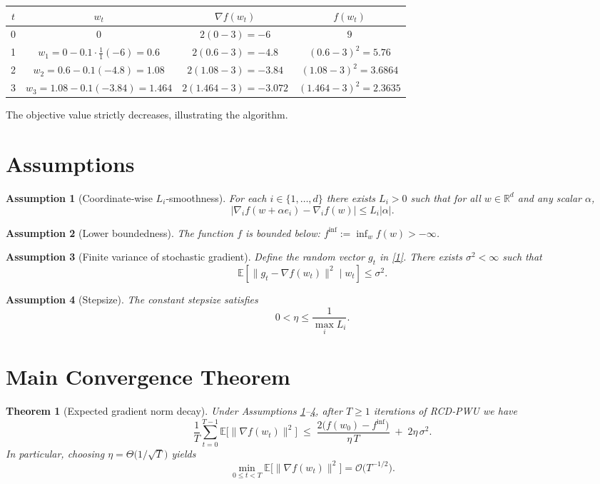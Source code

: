 \documentclass[11pt]{article}
\newtheorem{theorem}{Theorem}
\newtheorem{assumption}{Assumption}
\newcommand{\E}{\mathbb{E}}
\newcommand{\R}{\mathbb{R}}
\begin{document}
\begin{center}
\begin{tabular}{c|c|c|c}
$t$ & $w_t$ & $\nabla f(w_t)$ & $f(w_t)$\\ \hline
0 & $0$ & $2(0-3)=-6$ & $9$\\
1 & $w_1 = 0-0.1\cdot\frac{1}{1}(-6)=0.6$ &
       $2(0.6-3)=-4.8$ & $(0.6-3)^2=5.76$\\
2 & $w_2 = 0.6-0.1(-4.8)=1.08$ &
       $2(1.08-3)=-3.84$ & $(1.08-3)^2=3.6864$\\
3 & $w_3 = 1.08-0.1(-3.84)=1.464$ &
       $2(1.464-3)=-3.072$ & $(1.464-3)^2=2.3635$\\
\end{tabular}
\end{center}
The objective value strictly decreases, illustrating the algorithm.

\newpage

\section*{Assumptions}
\begin{assumption}[Coordinate‑wise $L_i$‑smoothness]\label{ass:smooth}
For each $i\in\{1,\dots ,d\}$ there exists $L_i>0$ such that for all
$w\in\R^{d}$ and any scalar $\alpha$,
\[
\bigl|\nabla_i f(w+\alpha e_i)-\nabla_i f(w)\bigr|\le L_i|\alpha|.
\tag{4}
\]
\end{assumption}

\begin{assumption}[Lower boundedness]\label{ass:bound}
The function $f$ is bounded below: $f^{\inf}:=\inf_{w}f(w)>-\infty$.
\end{assumption}

\begin{assumption}[Finite variance of stochastic gradient]\label{ass:var}
Define the random vector $g_t$ in \eqref{1}.  There exists $\sigma^2<\infty$ such that
\[
\E\!\left[\|g_t-\nabla f(w_t)\|^2\mid w_t\right]\le \sigma^2 .
\tag{5}
\]
\end{assumption}

\begin{assumption}[Stepsize]\label{ass:stepsize}
The constant stepsize satisfies
\[
0<\eta\le \frac{1}{\max_{i}L_i}.
\tag{6}
\]
\end{assumption}

\section*{Main Convergence Theorem}
\begin{theorem}[Expected gradient norm decay]\label{thm:main}
Under Assumptions \ref{ass:smooth}–\ref{ass:stepsize}, after $T\ge1$
iterations of RCD‑PWU we have
\[
\frac{1}{T}\sum_{t=0}^{T-1}\E\!\bigl[\|\nabla f(w_t)\|^2\bigr]
\;\le\;
\frac{2\bigl(f(w_0)-f^{\inf}\bigr)}{\eta\,T}
\;+\;
2\eta\,\sigma^2 .
\tag{7}
\]
In particular, choosing $\eta =\Theta\!\bigl(1/\sqrt{T}\bigr)$ yields
\[
\min_{0\le t<T}\E\!\bigl[\|\nabla f(w_t)\|^2\bigr]=
\mathcal{O}\!\bigl(T^{-1/2}\bigr).
\]
\end{theorem}
\end{document}
